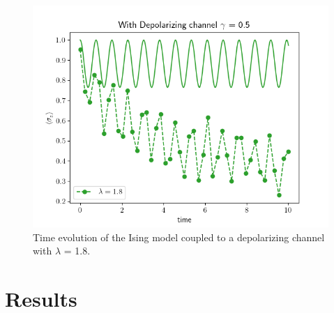 \documentclass[12pt]{article}
\begin{document}
\begin{figure}[!htb]
    \centering
    \includegraphics[width=\textwidth]{images/DepolChannelLambda18.png}
    \caption{Time evolution of the Ising model coupled to a depolarizing channel with $\lambda$ = 1.8.%
      \label{fig:DepolChannelLambda18}}
  \end{figure}

  \section{Results}

  \printbibliography
\end{document}
